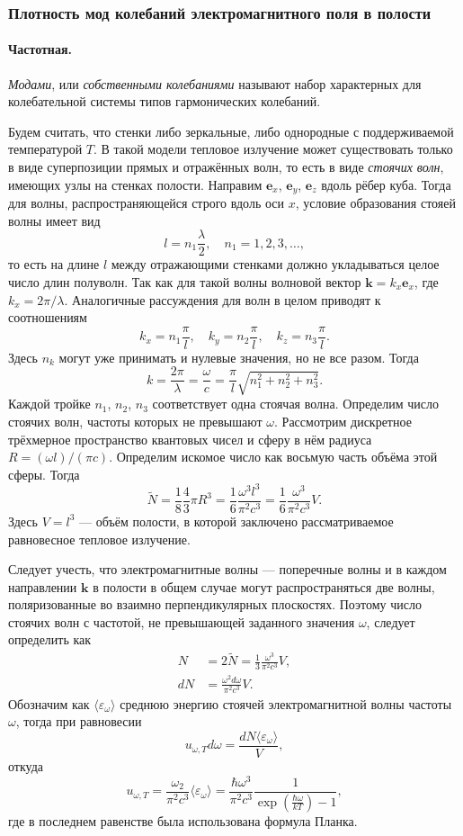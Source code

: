 \subsubsection{Плотность мод колебаний электромагнитного поля в полости}
\label{sec:plot-mod}
\paragraph{Частотная.}
\emph{Модами}, или \emph{собственными колебаниями} называют набор характерных
для колебательной системы типов гармонических колебаний. 

Будем считать, что стенки либо зеркальные, либо однородные с поддерживаемой
температурой $ T $. В такой модели тепловое излучение может существовать только
в виде суперпозиции прямых и отражённых волн, то есть в виде \emph{стоячих
волн}, имеющих узлы на стенках полости. Направим $ \mathbf e_x $, $ \mathbf e_y
$, $ \mathbf e_z $ вдоль рёбер куба. Тогда для волны, распространяющейся строго
вдоль оси $ x $, условие образования стояей волны имеет вид 
\[
    l = n_1 \frac{\lambda}{2}, \quad n_1 = 1, 2, 3, \ldots,
\]
то есть на длине $ l $ между отражающими стенками должно укладываться целое
число длин полуволн. Так как для такой волны волновой вектор $ \mathbf k = k_x
\mathbf e_x $, где $ k_x = 2\pi/\lambda $. Аналогичные рассуждения для волн в
целом приводят к соотношениям  
\[
    k_x = n_1 \frac{\pi}{l}, \quad k_y = n_2 \frac{\pi}{l}, \quad k_z = n_3
    \frac{\pi}{l}.
\]
Здесь $ n_k $ могут уже принимать и нулевые значения, но не все разом. Тогда  
\[
  k = \frac{2\pi}{\lambda} = \frac{\omega}{c} = \frac{\pi}{l} \sqrt{n_1^2 + n_2^2 + n_3^2}.
\]
Каждой тройке $ n_1 $, $ n_2 $, $ n_3 $ соответствует одна стоячая волна.
Определим число стоячих волн, частоты которых не превышают $ \omega $.
Рассмотрим дискретное трёхмерное пространство квантовых чисел и сферу в нём
радиуса $ R = (\omega l)/(\pi c) $. Определим искомое число как восьмую часть
объёма этой сферы. Тогда  
\[
    \tilde N = \frac{1}{8} \frac{4}{3} \pi R^3 = \frac{1}{6}
    \frac{\omega^3l^3}{\pi^2 c^3} = \frac{1}{6} \frac{\omega^3}{\pi^2 c^3} V.
\]
Здесь $ V = l^3 $ --- объём полости, в которой заключено рассматриваемое
равновесное тепловое излучение.

Следует учесть, что электромагнитные волны --- поперечные
волны и в каждом направлении $ \mathbf k $ в полости в общем случае могут
распространяться две волны, поляризованные во взаимно 
перпендикулярных плоскостях. Поэтому число стоячих волн с частотой,
не превышающей заданного значения $ \omega $, следует определить как 
\begin{align}
  N &= 2\tilde N = \frac{1}{3} \frac{\omega^3}{\pi^2 c^3}V,\\
  dN &= \frac{\omega^2 d\omega}{\pi^2 c^3}V.
  \label{eq:mods}
\end{align}
Обозначим как $ \langle \varepsilon_\omega \rangle $ среднюю энергию стоячей
электромагнитной волны частоты $ \omega $, тогда при равновесии
\[
  u_{\omega, T}d\omega = \frac{dN\langle \varepsilon_\omega \rangle}{V},  
\]
откуда  
\[
  u_{\omega, T} = \frac{\omega_2}{\pi^2 c^3} \langle \varepsilon_\omega \rangle
= \frac{\hbar \omega^3}{\pi^2 c^3} \frac{1}{\exp(\frac{\hbar\omega}{kT}) - 1},
\]
где в последнем равенстве была использована формула Планка.

